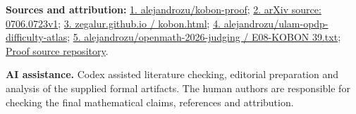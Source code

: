 \documentclass[11pt,a4paper]{article}
\begin{document}
\begin{samepage}
{\small\textbf{Sources and attribution:} \href{https://github.com/alejandrozu/kobon-proof/commit/99fdc8ec1ef8b1fb22c3da32b011b7361762e958}{1. alejandrozu/kobon-proof}; \href{https://arxiv.org/html/0706.0723v1}{2. arXiv source: 0706.0723v1}; \href{https://zegalur.github.io/line-order/gallery/kobon.html}{3. zegalur.github.io / kobon.html}; \href{https://github.com/alejandrozu/ulam-opdp-difficulty-atlas}{4. alejandrozu/ulam-opdp-difficulty-atlas}; \href{https://github.com/alejandrozu/openmath-2026-judging/blob/d0ed487f487fa7ec814ff705ab55249983fe8707/OpenMath-Judging/review/entries/E08-KOBON39.txt}{5. alejandrozu/openmath-2026-judging / E08-KOBON 39.txt}; \href{https://github.com/alejandrozu/openmath-2026-judging}{Proof source repository}.\par}

\end{samepage}
{\small \textbf{AI assistance.} Codex assisted literature checking, editorial preparation and analysis of the supplied formal artifacts. The human authors are responsible for checking the final mathematical claims, references and attribution.\par}
\end{document}
